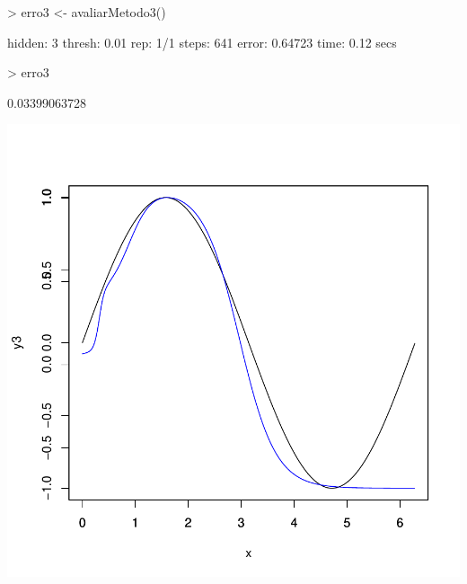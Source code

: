 \documentclass{article}
\begin{document}
\begin{Schunk}
\begin{Sinput}
>   erro3 <- avaliarMetodo3()
\end{Sinput}
\begin{Soutput}
hidden: 3    thresh: 0.01    rep: 1/1    steps:     641	error: 0.64723	time: 0.12 secs
\end{Soutput}
\begin{Sinput}
>   erro3
\end{Sinput}
\begin{Soutput}
[1] 0.03399063728
\end{Soutput}
\end{Schunk}
\includegraphics{mlppacotes-006}
\end{document}
